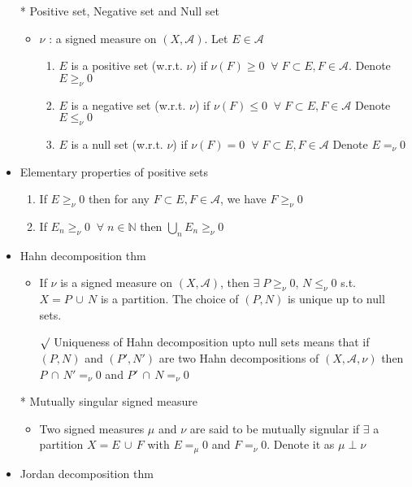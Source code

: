 \documentclass[12pt]{article}
\newcommand{\rmk}{$\surd$}
\newcommand{\N}{\mathbb{N}}
\newcommand{\A}{\mathcal{A}}
\newcommand{\exist}{\exists \;}
\newcommand{\forany}{\; \forall \;}
\newcommand{\union}{\,\cup\,}
\newcommand{\intersect}{\,\cap\,}
\begin{document}
\begin{itemize}
    \item[*] Positive set, Negative set and Null set
    \begin{itemize}
        \item $\nu$ : a signed measure on $(X, \A)$. Let $E\in \A$
        \begin{enumerate}
            \item $E$ is a positive set (w.r.t. $\nu$) if $\nu(F)\geq 0 \; \forany F\subset E, F\in \A$. \quad Denote $E\geq_\nu 0$
            \item $E$ is a negative set (w.r.t. $\nu$) if $\nu(F)\leq 0 \; \forany F\subset E, F\in \A$ \quad Denote $E\leq_\nu 0$
            \item $E$ is a null set (w.r.t. $\nu$) if $\nu(F)= 0 \; \forany F\subset E, F\in \A$ \quad Denote $E=_\nu 0$
        \end{enumerate}
    \end{itemize}
    \item Elementary properties of positive sets
    \begin{enumerate}
        \item If $E\geq_\nu0$ then for any $F\subset E, F\in \A$, we have $F\geq_\nu0$
        \item If $E_n\geq_\nu0\; \forany n\in \N$ then $\bigcup_n E_n\geq_\nu 0$
    \end{enumerate} 
    \item Hahn decomposition thm
    \begin{itemize}
        \item If $\nu$ is a signed measure on $(X, \A)$, then $\exist P\geq_\nu0,\, N\leq_\nu0$ \;s.t. $X=P\union N$ is a partition. The choice of $(P, N)$ is unique up to null sets. 
        \item[\rmk] Uniqueness of Hahn decomposition upto null sets means that if $(P, N)$ and $(P', N')$ are two Hahn decompositions of $(X, \A, \nu)$ then $P\intersect N'=_\nu 0$ and $P'\intersect N=_\nu 0$
    \end{itemize}
    \item[*] Mutually singular signed measure
    \begin{itemize}
        \item Two signed measures $\mu$ and $\nu$ are said to be mutually signular if $ \exists$ a partition $X=E\union F$ with $E=_\mu 0$ and $F=_\nu 0$. Denote it as $\mu \perp \nu$
    \end{itemize} 
    \item Jordan decomposition thm
    \begin{itemize}

\end{itemize}
\end{itemize}
\end{document}
